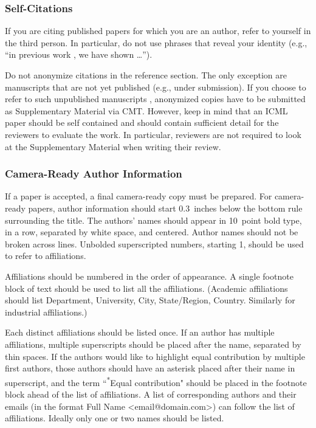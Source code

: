 \documentclass{article}
\begin{document}
\subsubsection{Self-Citations}

If you are citing published papers for which you are an author, refer
to yourself in the third person. In particular, do not use phrases
that reveal your identity (e.g., ``in previous work \cite{langley00}, we
have shown \ldots'').

Do not anonymize citations in the reference section. The only exception are manuscripts that are
not yet published (e.g., under submission). If you choose to refer to
such unpublished manuscripts \cite{anonymous}, anonymized copies have
to be submitted
as Supplementary Material via CMT\@. However, keep in mind that an ICML
paper should be self contained and should contain sufficient detail
for the reviewers to evaluate the work. In particular, reviewers are
not required to look at the Supplementary Material when writing their
review.

\subsubsection{Camera-Ready Author Information}
\label{final author}

If a paper is accepted, a final camera-ready copy must be prepared.
%
For camera-ready papers, author information should start 0.3~inches below the
bottom rule surrounding the title. The authors' names should appear in 10~point
bold type, in a row, separated by white space, and centered. Author names should
not be broken across lines. Unbolded superscripted numbers, starting 1, should
be used to refer to affiliations.

Affiliations should be numbered in the order of appearance. A single footnote
block of text should be used to list all the affiliations. (Academic
affiliations should list Department, University, City, State/Region, Country.
Similarly for industrial affiliations.)

Each distinct affiliations should be listed once. If an author has multiple
affiliations, multiple superscripts should be placed after the name, separated
by thin spaces. If the authors would like to highlight equal contribution by
multiple first authors, those authors should have an asterisk placed after their
name in superscript, and the term ``\textsuperscript{*}Equal contribution"
should be placed in the footnote block ahead of the list of affiliations. A
list of corresponding authors and their emails (in the format Full Name
\textless{}email@domain.com\textgreater{}) can follow the list of affiliations.
Ideally only one or two names should be listed.
\end{document}
